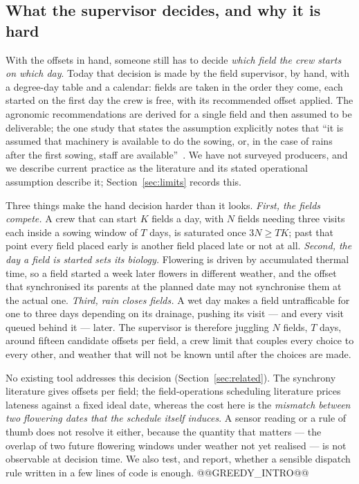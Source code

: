 \documentclass[10pt,twocolumn]{article}
\begin{document}
\subsection{What the supervisor decides, and why it is hard}

With the offsets in hand, someone still has to decide \emph{which field the
crew starts on which day}. Today that decision is made by the field
supervisor, by hand, with a degree-day table and a calendar: fields are
taken in the order they come, each started on the first day the crew is
free, with its recommended offset applied. The agronomic recommendations
are derived for a single field and then assumed to be deliverable; the one
study that states the assumption explicitly notes that ``it is assumed that
machinery is available to do the sowing, or, in the case of rains after the
first sowing, staff are available''~\cite{chassaigne2021}. We have not
surveyed producers, and we describe current practice as the literature and
its stated operational assumption describe it; Section~\ref{sec:limits}
records this.

Three things make the hand decision harder than it looks.
\emph{First, the fields compete.} A crew that can start $K$ fields a day,
with $N$ fields needing three visits each inside a sowing window of $T$
days, is saturated once $3N \ge TK$; past that point every field placed
early is another field placed late or not at all.
\emph{Second, the day a field is started sets its biology.} Flowering is
driven by accumulated thermal time, so a field started a week later flowers
in different weather, and the offset that synchronised its parents at the
planned date may not synchronise them at the actual one.
\emph{Third, rain closes fields.} A wet day makes a field untrafficable for
one to three days depending on its drainage, pushing its visit --- and every
visit queued behind it --- later. The supervisor is therefore juggling
$N$ fields, $T$ days, around fifteen candidate offsets per field, a crew
limit that couples every choice to every other, and weather that will not
be known until after the choices are made.

No existing tool addresses this decision (Section~\ref{sec:related}). The
synchrony literature gives offsets per field; the field-operations
scheduling literature prices lateness against a fixed ideal date, whereas
the cost here is the \emph{mismatch between two flowering dates that the
schedule itself induces}. A sensor reading or a rule of thumb does not
resolve it either, because the quantity that matters --- the overlap of two
future flowering windows under weather not yet realised --- is not
observable at decision time. We also test, and report, whether a sensible
dispatch rule written in a few lines of code is enough. @@GREEDY_INTRO@@
\end{document}
